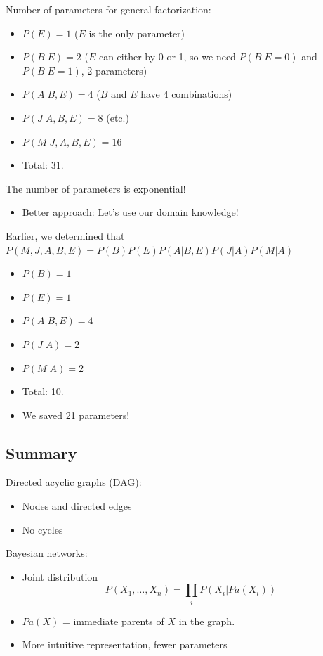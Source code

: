 \documentclass[10pt]{article}
\begin{document}
Number of parameters for general factorization:
\begin{itemize}
	\item $P(E) = 1$ ($E$ is the only parameter)
    \item $P(B | E) = 2$ ($E$ can either by 0 or 1, so we need $P(B | E = 0)$ and $P(B | E = 1)$, 2 parameters)
    \item $P(A | B, E) = 4$ ($B$ and $E$ have 4 combinations)
    \item $P(J | A, B, E) = 8$ (etc.)
    \item $P(M | J, A, B, E) = 16$
    \item Total: 31. 
\end{itemize}
The number of parameters is exponential! 
\begin{itemize}
	\item Better approach: Let's use our domain knowledge!
\end{itemize}
Earlier, we determined that $P(M, J, A, B, E) = P(B) P(E) P(A | B, E) P(J | A) P(M | A)$
\begin{itemize}
	\item $P(B) = 1$
	\item $P(E) = 1$
	\item $P(A | B, E) = 4$
	\item $P(J | A) = 2$
	\item $P(M | A) = 2$
	\item Total: 10.
	\item We saved 21 parameters!
\end{itemize}

\subsection*{Summary}
Directed acyclic graphs (DAG):
\begin{itemize}
	\item Nodes and directed edges
	\item No cycles
\end{itemize}
Bayesian networks:
\begin{itemize}
	\item Joint distribution
    \[P(X_1, \dots, X_n) = \prod_i P(X_i | Pa(X_i))\]
    \item $Pa(X)$ = immediate parents of $X$ in the graph.
    \item More intuitive representation, fewer parameters
\end{itemize}
\end{document}
